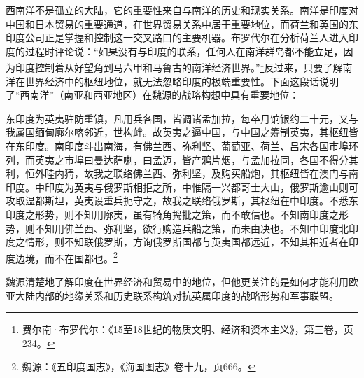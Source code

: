 \documentclass[a4paper, 12pt, openright]{ctexbook}
\renewenvironment{quote}
  {\list{}{\rightmargin2\ccwd \leftmargin2\ccwd \itemindent=2\ccwd \listparindent=2\ccwd}%
   \item\relax\small\kaishu\color{black}}
  {\endlist}
\begin{document}
西南洋不是孤立的大陆，它的重要性来自与南洋的历史和现实关系。南洋是印度对中国和日本贸易的重要通道，在世界贸易关系中居于重要地位，而荷兰和英国的东印度公司正是掌握和控制这一交叉路口的主要机器。布罗代尔在分析荷兰人进入印度的过程时评论说：“如果没有与印度的联系，任何人在南洋群岛都不能立足，因为印度控制着从好望角到马六甲和马鲁古的南洋经济世界。”\footnote{费尔南·布罗代尔：《15至18世纪的物质文明、经济和资本主义》，第三卷，页234。}反过来，只要了解南洋在世界经济中的枢纽地位，就无法忽略印度的极端重要性。下面这段话说明了“西南洋”（南亚和西亚地区）在魏源的战略构想中具有重要地位：

\begin{quote}
东印度为英夷驻防重镇，凡用兵各国，皆调诸孟加拉，每卒月饷银约二十元，又与我属国缅甸廓尔喀邻近，世构衅。故英夷之逼中国，与中国之筹制英夷，其枢纽皆在东印度。南印度斗出南海，有佛兰西、弥利坚、葡萄亚、荷兰、吕宋各国市埠环列，而英夷之市埠曰曼达萨喇，曰孟迈，皆产鸦片烟，与孟加拉同，各国不得分其利，恒外睦内猜，故我之联络佛兰西、弥利坚，及购买船炮，其枢纽皆在澳门与南印度。中印度为英夷与俄罗斯相拒之所，中惟隔一兴都哥士大山，俄罗斯逾山则可攻取温都斯坦，英夷设重兵扼守之，故我之联络俄罗斯，其枢纽在中印度。不悉东印度之形势，则不知用廓夷，虽有犄角捣批之策，而不敢信也。不知南印度之形势，则不知用佛兰西、弥利坚，欲行购造兵船之策，而未由决也。不知中印度北印度之情形，则不知联俄罗斯，方询俄罗斯国都与英夷国都远近，不知其相近者在印度边境，而不在国都也。\footnote{魏源：《五印度国志》，《海国图志》卷十九，页666。}
\end{quote}

魏源清楚地了解印度在世界经济和贸易中的地位，但他更关注的是如何才能利用欧亚大陆内部的地缘关系和历史联系构筑对抗英属印度的战略形势和军事联盟。
\end{document}
